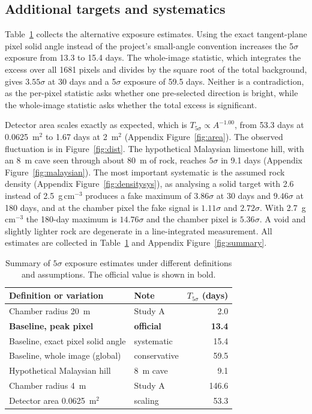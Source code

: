 \documentclass{article}
\begin{document}
\subsection{Additional targets and systematics}

Table~\ref{tab:summary} collects the alternative exposure estimates. Using the
exact tangent-plane pixel solid angle instead of the project's small-angle
convention increases the 5$\sigma$ exposure from 13.3 to 15.4 days. The
whole-image statistic, which integrates the excess over all 1681 pixels and
divides by the square root of the total background, gives $3.55\sigma$ at
30 days and a 5$\sigma$ exposure of 59.5 days. Neither is a contradiction, as the
per-pixel statistic asks whether one pre-selected direction is bright, while
the whole-image statistic asks whether the total excess is significant.

Detector area scales exactly as expected, which is $T_{5\sigma}\propto A^{-1.00}$, from
53.3 days at 0.0625~m$^2$ to 1.67 days at 2~m$^2$ (Appendix
Figure~\ref{fig:area}). The observed fluctuation is in
Figure~\ref{fig:dist}. The hypothetical Malaysian limestone hill, with an 8~m
cave seen through about 80~m of rock, reaches $5\sigma$ in 9.1 days (Appendix
Figure~\ref{fig:malaysian}). The most important systematic is the assumed rock
density (Appendix Figure~\ref{fig:densitysys}), as analysing a solid target with
2.6 instead of 2.5~g\,cm$^{-3}$ produces a fake maximum of $3.86\sigma$ at
30 days and $9.46\sigma$ at 180 days, and at the chamber pixel the fake signal is
$1.11\sigma$ and $2.72\sigma$. With 2.7~g\,cm$^{-3}$ the 180-day maximum is
$14.76\sigma$ and the chamber pixel is $5.36\sigma$. A void and slightly
lighter rock are degenerate in a line-integrated measurement. All estimates are
collected in Table~\ref{tab:summary} and Appendix Figure~\ref{fig:summary}.

\begin{table}[t]
\centering
\caption{Summary of $5\sigma$ exposure estimates under different definitions
and assumptions. The official value is shown in bold.}
\label{tab:summary}
\small
\begin{tabular}{@{}llr@{}}
\toprule
Definition or variation & Note & $T_{5\sigma}$ (days) \\
\midrule
Chamber radius 20~m & Study A & 2.0 \\
\textbf{Baseline, peak pixel} & \textbf{official} & \textbf{13.4} \\
Baseline, exact pixel solid angle & systematic & 15.4 \\
Baseline, whole image (global) & conservative & 59.5 \\
Hypothetical Malaysian hill & 8~m cave & 9.1 \\
Chamber radius 4~m & Study A & 146.6 \\
Detector area 0.0625~m$^2$ & scaling & 53.3 \\
\bottomrule
\end{tabular}
\end{table}
\end{document}
